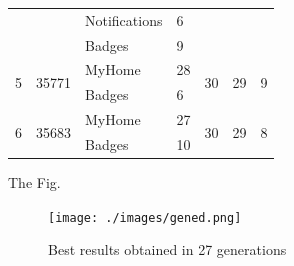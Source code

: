 \begin{table}[h]
\begin{tabular}{|p{0.2cm}|l|l|l|l|p{0.45cm}|p{0.45cm}|}
                   &                        & Notifications & 6               &                     &                     &                     \\ \cline{3-4}
                   &                        & Badges        & 9               &                     &                     &                     \\ \hline
\multirow{2}{*}{5} & \multirow{2}{*}{35771} & MyHome        & 28              & \multirow{2}{*}{30} & \multirow{2}{*}{29} & \multirow{2}{*}{9}  \\ \cline{3-4}
                   &                        & Badges        & 6               &                     &                     &                     \\ \hline
\multirow{2}{*}{6} & \multirow{2}{*}{35683} & MyHome        & 27              & \multirow{2}{*}{30} & \multirow{2}{*}{29} & \multirow{2}{*}{8}  \\ \cline{3-4}
                   &                        & Badges        & 10              &                     &                     &                     \\ \hline
\end{tabular}
\end{table}


The Fig.

\begin{figure}[h]
\centering
\caption{Best results obtained in 27 generations}
\texttt{[image: ./images/gened.png]}
\label{fig:exp1bestresults}
\end{figure}

 